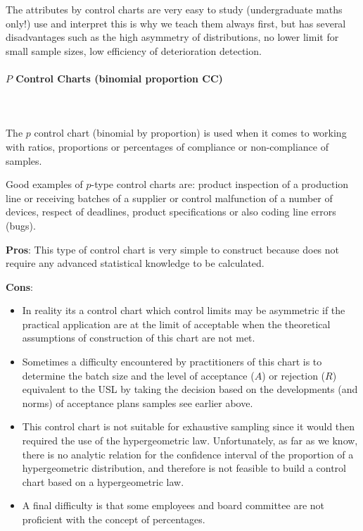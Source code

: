 	The attributes by control charts are very easy to study (undergraduate maths only!) use and interpret this is why we teach them always first, but has several disadvantages such as the high asymmetry of distributions, no lower limit for small sample sizes, low efficiency of deterioration detection.
	
	\pagebreak
	\paragraph{$P$ Control Charts (binomial proportion CC)}\mbox{}\\\\
	The $p$ control chart (binomial by proportion) is used when it comes to working with ratios, proportions or percentages of compliance or non-compliance of samples.

	Good examples of $p$-type control charts are: product inspection of a production line or receiving batches of a supplier or control malfunction of a number of devices, respect of deadlines, product specifications or also coding line errors (bugs).

	\textbf{Pros}: This type of control chart is very simple to construct because does not require any advanced statistical knowledge to be calculated.

	\textbf{Cons}: 
	\begin{itemize}
		\item In reality its a control chart which control limits may be asymmetric if the practical application are at the limit of acceptable when the theoretical assumptions of construction of this chart are not met. 
		
		\item Sometimes a difficulty encountered by practitioners of this chart is to determine the batch size and the level of acceptance ($A$) or rejection ($R$) equivalent to the USL by taking the decision based on the developments (and norms) of acceptance plans samples see earlier above. 
		
		 \item This control chart is not suitable for exhaustive sampling since it would then required the use of the hypergeometric law. Unfortunately, as far as we know, there is no analytic relation for the confidence interval of the proportion of a hypergeometric distribution, and therefore is not feasible to build a control chart  based on a hypergeometric law.
		
		\item A final difficulty is that some employees and board committee are not proficient with the concept of percentages.
	\end{itemize}

